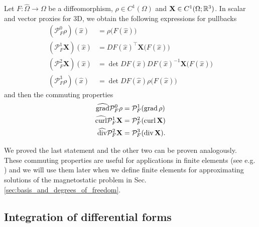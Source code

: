 \documentclass[../master_thesis.tex]{subfiles}
\begin{document}
\begin{proposition}\label{prop:pullback_and_commutativity_3D}
    Let $F: \hat{\Omega} \rightarrow \Omega$ be a diffeomorphism, 
    $\rho \in C^1(\Omega)$ and $\mathbf{X} \in C^1(\Omega; \mathbb{R}^3)$.
    In scalar and vector proxies for 3D, we obtain the following expressions for 
    pullbacks
    \begin{align*}
        (\mathcal{P}^0_F \rho)(\hat{x}) &= \rho\big(F(\hat{x})\big)
        \\ (\mathcal{P}^1_F \mathbf{X})(\hat{x}) &= DF(\hat{x})^\top \mathbf{X}\big(F(\hat{x})\big)
        \\ (\mathcal{P}^2_F \mathbf{X})(\hat{x}) &= \det DF(\hat{x}) DF(\hat{x})^{-1} \mathbf{X}\big(F(\hat{x})\big)
        \\ (\mathcal{P}^3_F \rho)(\hat{x}) &= \det DF(\hat{x}) \rho\big(F(\hat{x})\big)
    \end{align*}
    and then the commuting properties
    \begin{align*}
        \widehat{\operatorname{grad}} \mathcal{P}^0_F \rho &= \mathcal{P}^1_F (\operatorname{grad} \rho)
        \\ \widehat{\mathbf{\operatorname{curl}}} \mathcal{P}^1_F \mathbf{X} &= \mathcal{P}^2_F (\operatorname{curl} \mathbf{X})
        \\ \widehat{\operatorname{div}} \mathcal{P}^2_F \mathbf{X} &= \mathcal{P}^3_F (\operatorname{div} \mathbf{X}).
    \end{align*}
\end{proposition}
We proved the last statement and the other two can be proven analogously. 
These commuting properties are useful for applications in finite elements
(see e.g. \cite[Sec.\,14.3]{ern_guermond}) and we will use them later when we 
define finite elements 
for approximating solutions of the magnetostatic problem in Sec.\,\ref{sec:basis_and_degrees_of_freedom}.





\subsection{Integration of differential forms}\label{sec:integration_of_differential_forms}
\end{document}
